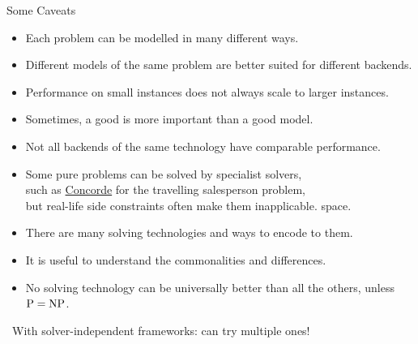 \documentclass{cons-beamer}
\begin{document}
\begin{frame}{Some Caveats}
  \begin{itemize}
    \item Each problem can be modelled in many different ways.
    \item Different models of the same problem are better suited for different
      backends.
    \item Performance on small instances does not always scale to larger
      instances.
    \item Sometimes, a good  is more important
      than a good model.
    \item Not all backends of the same technology have comparable
      performance.
    \item Some pure problems can be solved by specialist solvers, \\
      such as
      \href{https://www.math.uwaterloo.ca/tsp/concorde}{Concorde} for
      the travelling salesperson problem, \\ but real-life side
      constraints often make them inapplicable.
      space.
  \end{itemize}
\end{frame}

\begin{frame}
  \begin{itemize}
    \item There are many solving technologies and ways to encode to them.
    \item It is useful to understand the commonalities and differences.
    \item No solving technology can be universally better
      than all the others, unless $\textnormal{P} = \textnormal{NP}$.
  \end{itemize}
  \begin{center}
    \handpoint\ With solver-independent frameworks: can try multiple ones!
  \end{center}

\end{frame}
\end{document}

